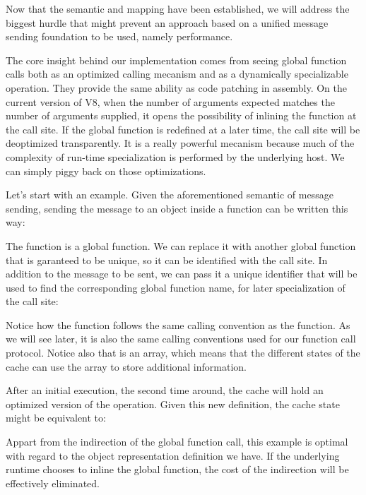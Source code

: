 Now that the semantic and mapping have been established, we will address the
biggest hurdle that might prevent an approach based on a unified message
sending foundation to be used, namely performance.

The core insight behind our implementation comes from seeing global function
calls both as an optimized calling mecanism and as a dynamically specializable
operation. They provide the same ability as code patching in assembly. On
the current version of V8, when the number of arguments expected matches the
number of arguments supplied, it opens the possibility of inlining the function
at the call site. If the global function is redefined at a later time, the call
site will be deoptimized transparently. It is a really powerful mecanism
because much of the complexity of run-time specialization is performed by the
underlying host.  We can simply piggy back on those optimizations.

Let's start with an example. Given the aforementioned semantic of message
sending, sending the message  to an object  inside a 
function can be written this way:


The  function is a global function. We can replace it with another
global function that is garanteed to be unique, so it can be identified with
the call site. In addition to the message to be sent, we can pass it a unique
identifier that will be used to find the corresponding global function name,
for later specialization of the call site:


Notice how the  function follows the same calling convention as
the  function. As we will see later, it is also the same calling
conventions used for our function call protocol. Notice also that
 is an array, which means that the different states of the cache
can use the array to store additional information.

After an initial execution, the second time around, the cache will hold an
optimized version of the operation. Given this new definition, the cache state
might be equivalent to:


Appart from the indirection of the global function call, this example is
optimal with regard to the object representation definition we have. If the
underlying runtime chooses to inline the global function, the cost of the
indirection will be effectively eliminated.

